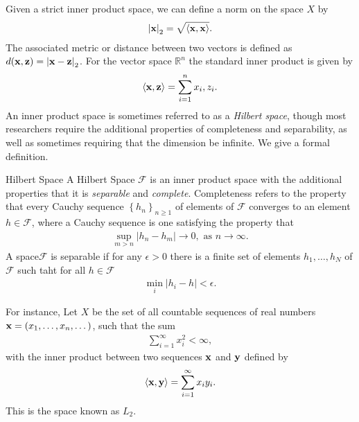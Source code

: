 Given a strict inner product space, we can define a norm on the space $X$ by 
\begin{align*}
	\left|{\mathbf{x}}\right|_2=\sqrt{\left<{\mathbf{x}}, {\mathbf{x}}\right>}.
\end{align*}
The associated metric or distance between two vectors is defined as $d({\mathbf{x}}, {\mathbf{z}}) = \left|{\mathbf{x}}-{\mathbf{z}}\right|_2$. For the vector space $\mathbb{R}^n$ the standard inner product is given by 
\begin{align*}
	\left<{\mathbf{x}}, {\mathbf{z}}\right> = \sum_{i=1}^n x_i,z_i.
\end{align*}
An inner product space is sometimes referred to as a \textit{Hilbert space}, though most researchers require the additional properties of completeness and separability, as well as sometimes requiring that the dimension be infinite. We give a formal definition.

\begin{Definition}{Hilbert Space}
	A Hilbert Space $\mathcal{F}$ is an inner product space with the additional properties that it is \textit{separable} and \textit{complete}. Completeness refers to the property that every Cauchy sequence $\left\{h_n\right\}_{n\geq 1}$ of elements of $\mathcal{F}$ converges to an element $h\in \mathcal{F}$, where a Cauchy sequence is one satisfying the property that 
	\begin{align*}
		\sup_{m>n}\left|h_n-h_m\right|\to 0, \text{ as } n\to \infty.
	\end{align*}
	A space$\mathcal{F}$ is separable if for any $\epsilon>0$ there is a finite set of elements $h_1,\dots, h_N$ of $\mathcal{F}$ such taht for all $h\in \mathcal{F}$
	\begin{align*}
		\min_i \left|h_i-h\right|<\epsilon.
	\end{align*}
\end{Definition}

For instance, Let $X$ be the set of all countable sequences of real numbers ${\mathbf{x}} = (x_1,\dots, x_n, \dots)$, such that the sum 
\begin{align*}
	\sum_{i=1}^{\infty} x_i^2<\infty,
\end{align*}
with the inner product between two sequences ${\mathbf{x}}$ and ${\mathbf{y}}$ defined by
\begin{align*}
	\left<{\mathbf{x}}, {\mathbf{y}}\right> = \sum_{i=1}^{\infty} x_iy_i.
\end{align*}
This is the space known as $L_2$.

